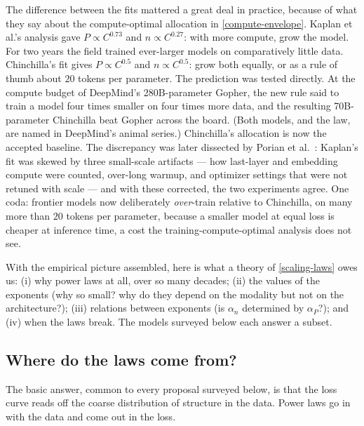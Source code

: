 \documentclass[11pt]{article}
\begin{document}
The difference between the fits mattered a great deal in practice, because of what they say about the compute-optimal allocation in \eqref{compute-envelope}. Kaplan et al.'s analysis gave $P\propto C^{0.73}$ and $n\propto C^{0.27}$: with more compute, grow the model. For two years the field trained ever-larger models on comparatively little data. Chinchilla's fit gives $P\propto C^{0.5}$ and $n\propto C^{0.5}$: grow both equally, or as a rule of thumb about $20$ tokens per parameter. The prediction was tested directly. At the compute budget of DeepMind's 280B-parameter Gopher, the new rule said to train a model four times smaller on four times more data, and the resulting 70B-parameter Chinchilla beat Gopher across the board. (Both models, and the law, are named in DeepMind's animal series.) Chinchilla's allocation is now the accepted baseline. The discrepancy was later dissected by Porian et al.\ \cite{porian2024resolving}: Kaplan's fit was skewed by three small-scale artifacts --- how last-layer and embedding compute were counted, over-long warmup, and optimizer settings that were not retuned with scale --- and with these corrected, the two experiments agree. One coda: frontier models now deliberately \emph{over}-train relative to Chinchilla, on many more than $20$ tokens per parameter, because a smaller model at equal loss is cheaper at inference time, a cost the training-compute-optimal analysis does not see.

With the empirical picture assembled, here is what a theory of \eqref{scaling-laws} owes us: (i) why power laws at all, over so many decades; (ii) the values of the exponents (why so small? why do they depend on the modality but not on the architecture?); (iii) relations between exponents (is $\alpha_n$ determined by $\alpha_P$?); and (iv) when the laws break. The models surveyed below each answer a subset.

\subsection{Where do the laws come from?}
\label{sec:scaling-origins}

The basic answer, common to every proposal surveyed below, is that the loss curve reads off the coarse distribution of structure in the data. Power laws go in with the data and come out in the loss.
\end{document}
